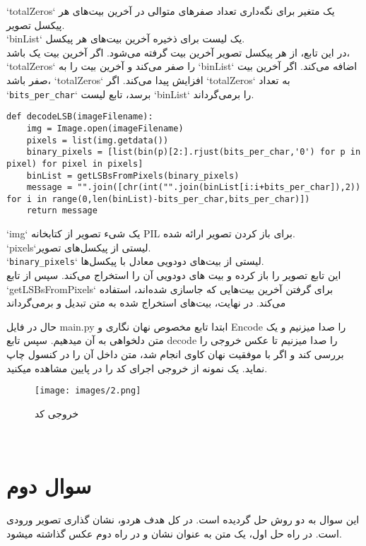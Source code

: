 `totalZeros` یک متغیر برای نگه‌داری تعداد صفرهای متوالی در آخرین بیت‌های هر پیکسل تصویر.\\
`binList` یک لیست برای ذخیره آخرین بیت‌های هر پیکسل.\\
در این تابع، از هر پیکسل تصویر آخرین بیت گرفته می‌شود. اگر آخرین بیت یک باشد، `totalZeros` را صفر می‌کند و آخرین بیت را به `binList` اضافه می‌کند. اگر آخرین بیت صفر باشد، `totalZeros` افزایش پیدا می‌کند. اگر `totalZeros` به تعداد `\texttt{bits\_per\_char}` برسد، تابع لیست `binList` را برمی‌گرداند.

\begin{lstlisting}[caption={Python code}]
def decodeLSB(imageFilename):
    img = Image.open(imageFilename)
    pixels = list(img.getdata())
    binary_pixels = [list(bin(p)[2:].rjust(bits_per_char,'0') for p in pixel) for pixel in pixels]
    binList = getLSBsFromPixels(binary_pixels)
    message = "".join([chr(int("".join(binList[i:i+bits_per_char]),2)) for i in range(0,len(binList)-bits_per_char,bits_per_char)])
    return message
\end{lstlisting}

`img` یک شیء تصویر از کتابخانه PIL برای باز کردن تصویر ارائه شده.\\
`pixels`لیستی از پیکسل‌های تصویر.\\
`\texttt{binary\_pixels}` لیستی از بیت‌های دودویی معادل با پیکسل‌ها.\\
این تابع تصویر را باز کرده و بیت‌ های دودویی آن را استخراج می‌کند. سپس از تابع `getLSBsFromPixels` برای گرفتن آخرین بیت‌هایی که جاسازی شده‌اند، استفاده می‌کند. در نهایت، بیت‌های استخراج شده به متن تبدیل و برمی‌گرداند

حال در فایل main.py ابتدا تابع مخصوص نهان نگاری و Encode را صدا میزنیم و یک متن دلخواهی به آن میدهیم. سپس تابع decode را صدا میزنیم تا عکس خروجی را بررسی کند و اگر با موفقیت نهان کاوی انجام شد، متن داخل آن را در کنسول چاپ نماید. یک نمونه از خروجی اجرای کد را در پایین مشاهده میکنید.

\begin{figure}[h!]
    \centering
    \begin{minipage}{0.9\textwidth}
        \centering
        \texttt{[image: images/2.png]}
        \caption{خروجی کد}
        \label{fig:input}
    \end{minipage}
\end{figure}\\

\section{سوال دوم}
این سوال به دو روش حل گردیده است. در کل هدف هردو، نشان گذاری تصویر ورودی است. در راه حل اول، یک متن به عنوان نشان و در راه دوم عکس گذاشته میشود.
